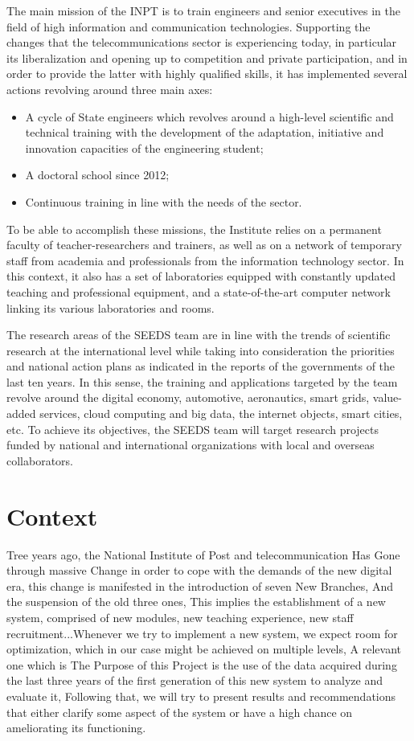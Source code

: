 \documentclass[12pt]{extreport}
\begin{document}
The main mission of the INPT is to train engineers and senior executives in the field of high information and communication technologies. Supporting the changes that the telecommunications sector is experiencing today, in particular its liberalization and opening up to competition and private participation, and in order to provide the latter with highly qualified skills, it has implemented several actions revolving around three main axes:
\begin{itemize}
	\item A cycle of State engineers which revolves around a high-level scientific and technical training with the development of the adaptation, initiative and innovation capacities of the engineering student;

	\item A doctoral school since 2012;

	\item Continuous training in line with the needs of the sector.
\end{itemize}

To be able to accomplish these missions, the Institute relies on a permanent faculty of teacher-researchers and trainers, as well as on a network of temporary staff from academia and professionals from the information technology sector. In this context, it also has a set of laboratories equipped with constantly updated teaching and professional equipment, and a state-of-the-art computer network linking its various laboratories and rooms. 


The research areas of the SEEDS team are in line with the trends of scientific research at the international level while taking into consideration the priorities and national action plans as indicated in the reports of the governments of the last ten years. In this sense, the training and applications targeted by the team revolve around the digital economy, automotive, aeronautics, smart grids, value-added services, cloud computing and big data, the internet objects, smart cities, etc. To achieve its objectives, the SEEDS team will target research projects funded by national and international organizations with local and overseas collaborators. 

\section{Context}
Tree years ago, the National Institute of Post and telecommunication Has Gone through massive
Change in order to cope with the demands of the new digital era, this change is manifested in the
introduction of seven New Branches, And the suspension of the old three ones, This implies the
establishment of a new system, comprised of new modules, new teaching experience, new staff 
recruitment...Whenever we try to implement a new system, we expect room for optimization, which in
our case might be achieved on multiple levels, A relevant one which is The Purpose of this Project
is the use of the data acquired during the last three years of the first generation of this new system to analyze and evaluate it, Following that, we will try to present results and recommendations that either clarify some aspect of the system or have a high chance on ameliorating its functioning.
\end{document}
